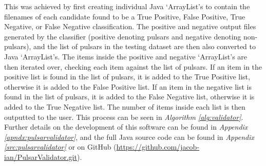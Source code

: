 \documentclass{article}
\begin{document}
This was achieved by first creating individual Java `ArrayList's to contain the filenames of each candidate found to be a True Positive, False Positive, True Negative, or False Negative classification. The positive and negative output files generated by the classifier (positive denoting pulsars and negative denoting non-pulsars), and the list of pulsars in the testing dataset are then also converted to Java `ArrayList's. The items inside the positive and negative `ArrayList's are then iterated over, checking each item against the list of pulsars. If an item in the positive list is found in the list of pulsars, it is added to the True Positive list, otherwise it is added to the False Positive list. If an item in the negative list is found in the list of pulsars, it is added to the False Negative list, otherwise it is added to the True Negative list. The number of items inside each list is then outputted to the user. This process can be seen in \emph{Algorithm \ref{alg:validator}}. Further details on the development of this software can be found in \emph{Appendix \ref{apndx:pulsarvalidator}}, and the full Java source code can be found in \emph{Appendix \ref{src:pulsarvalidator}} or on GitHub (\href{https://github.com/jacob-ian/PulsarValidator.git}{https://github.com/jacob-ian/PulsarValidator.git}).
\end{document}
